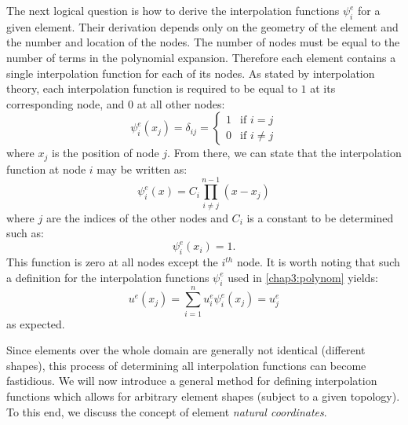\medskip

The next logical question is how to derive the interpolation functions $ \psi^e_i  $ for a given element. Their derivation depends only on the geometry of the element and the number and location of the nodes. The number of nodes must be equal to the number of terms in the polynomial expansion. Therefore each element contains a single interpolation function for each of its nodes. As stated by interpolation theory, each interpolation function is required to be equal to $1$ at its corresponding node, and $0$ at all other nodes:
\begin{equation} 
	\psi^e_i(x_j) = \delta_{ij} = 
	\begin{cases} 
		1 & \text{if } i = j \\ 
		0 & \text{if } i \neq j
	\end{cases}
\end{equation}
where $ x_j $ is the position of node $j$. From there, we can state that the interpolation function at node $ i $ may be written as:
\begin{equation}
\psi^e_i(x) = C_i \prod_{i \neq j}^{n-1} (x-x_j)
\end{equation}
where $ j $ are the indices of the other nodes and $ C_i $ is a constant to be determined such as:
\begin{equation}
\psi^e_i(x_i) = 1.
\end{equation}
This function is zero at all nodes except the $i^{th}$ node. It is worth noting that such a definition for the interpolation functions $ \psi^e_i $ used in \eqref{chap3:polynom} yields:
\begin{equation}
u^e(x_j) = \sum_{i=1}^n u^e_i \psi^e_i(x_j) = u^e_j
\end{equation}
as expected. 

Since elements over the whole domain are generally not identical (different shapes), this process of determining all interpolation functions can become fastidious. We will now introduce a general method for defining interpolation functions which allows for arbitrary element shapes (subject to a given topology). To this end, we discuss the concept of element \emph{natural coordinates}.

